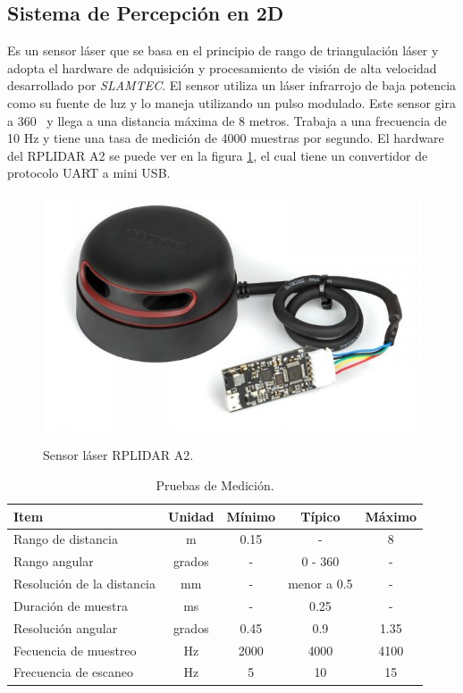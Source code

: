 \subsection{Sistema de Percepci\'on en 2D}
Es un sensor l\'aser que se basa en el  principio de rango de triangulaci\'on 
láser \cite{amann2001laser} y adopta el hardware de adquisici\'on y 
procesamiento de visi\'on de alta velocidad desarrollado por \textit{SLAMTEC}. El 
sensor utiliza un l\'aser infrarrojo de baja potencia como su fuente de luz y lo 
maneja utilizando un pulso modulado. Este sensor gira a 360 \grad ~y llega a 
una distancia m\'axima de 8 metros. Trabaja a una frecuencia de 10 Hz y 
tiene una tasa de medici\'on de 4000 muestras por segundo. El hardware del 
RPLIDAR A2 se puede ver en la figura \ref{f:lidar}, el cual tiene un 
convertidor de protocolo UART a mini USB.
\begin{figure}%
\centering \footnotesize
 {\includegraphics[width=0.60\linewidth]{images/rplidar.JPG}}
 \captionsetup{font=footnotesize}
 \caption{Sensor láser RPLIDAR A2.}
 \label{f:lidar}
\end{figure}

\begin{table}[htbp]
\begin{center}
\begin{tabular}{|l|c|c|c|c|}
\hline
Item & Unidad & M\'inimo & T\'ipico & M\'aximo\\
\hline \hline
Rango de distancia & m & 0.15 & - & 8 \\ \hline
Rango angular & grados & - & 0 - 360 & - \\ \hline
Resoluci\'on de la distancia & mm & - & menor a 0.5 & - \\ \hline
Duraci\'on de muestra & ms & - & 0.25 & - \\ \hline
Resoluci\'on angular & grados & 0.45 & 0.9 & 1.35 \\ \hline
Fecuencia de muestreo & Hz & 2000 & 4000 & 4100 \\ \hline
Frecuencia de escaneo & Hz & 5 & 10 & 15 \\ \hline
\end{tabular}
\caption{Pruebas de Medici\'on.}
\label{tbl:medicion}
\end{center}
\end{table}

